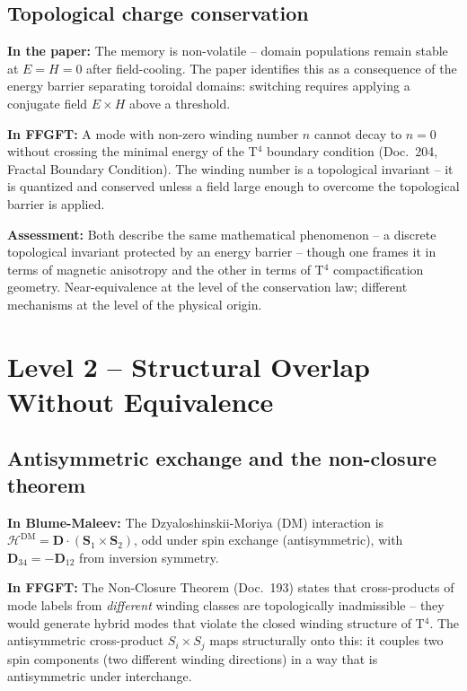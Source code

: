 \subsection{Topological charge conservation}

\textbf{In the paper:} The memory is non-volatile -- domain populations
remain stable at $E = H = 0$ after field-cooling. The paper identifies
this as a consequence of the energy barrier separating toroidal domains:
switching requires applying a conjugate field $E\times H$ above a threshold.

\textbf{In FFGFT:} A mode with non-zero winding number $n$ cannot decay to
$n = 0$ without crossing the minimal energy of the T$^4$ boundary condition
(Doc.~204, Fractal Boundary Condition). The winding number is a topological
invariant -- it is quantized and conserved unless a field large enough to
overcome the topological barrier is applied.

\textbf{Assessment:} Both describe the same mathematical phenomenon -- a
discrete topological invariant protected by an energy barrier -- though one
frames it in terms of magnetic anisotropy and the other in terms of T$^4$
compactification geometry. Near-equivalence at the level of the conservation
law; different mechanisms at the level of the physical origin.

\section{Level 2 -- Structural Overlap Without Equivalence}

\subsection{Antisymmetric exchange and the non-closure theorem}

\textbf{In Blume-Maleev:} The Dzyaloshinskii-Moriya (DM) interaction is
$\mathcal{H}^{\mathrm{DM}} = \mathbf{D}\cdot(\mathbf{S}_1\times\mathbf{S}_2)$,
odd under spin exchange (antisymmetric), with $\mathbf{D}_{34} = -\mathbf{D}_{12}$
from inversion symmetry.

\textbf{In FFGFT:} The Non-Closure Theorem (Doc.~193) states that cross-products
of mode labels from \emph{different} winding classes are topologically
inadmissible -- they would generate hybrid modes that violate the closed
winding structure of T$^4$. The antisymmetric cross-product $S_i\times S_j$
maps structurally onto this: it couples two spin components (two different
winding directions) in a way that is antisymmetric under interchange.

